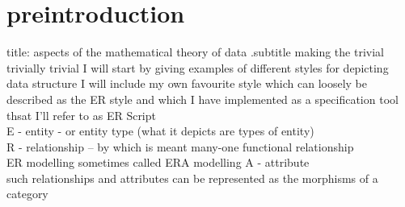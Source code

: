 \documentclass[10pt,a4paper]{article}
\theoremstyle{remark}
\begin{document}
\section{preintroduction}
title: aspects of the mathematical theory of data
.subtitle making the trivial trivially trivial
\note
I will start by giving examples of different styles for depicting data structure
\note
I will include my own favourite style which can loosely be described as the ER style
and which I have implemented as a specification tool thsat I'll refer to as ER Script\\
E - entity - or entity type (what it depicts are types of entity)\\
R - relationship -- by which is meant many-one functional relationship\\
\note
ER modelling sometimes called ERA modelling
A - attribute \\
such relationships and attributes can be represented as the morphisms of a category
\end{document}
